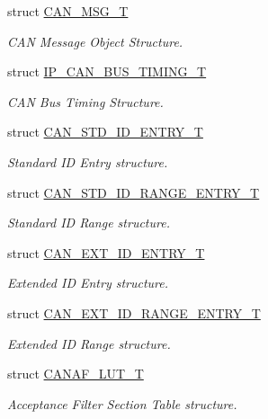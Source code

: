 \begin{DoxyCompactItemize}
struct \hyperlink{structCAN__MSG__T}{C\-A\-N\-\_\-\-M\-S\-G\-\_\-\-T}
\begin{DoxyCompactList}\small\item\em C\-A\-N Message Object Structure. \end{DoxyCompactList}\item 
struct \hyperlink{structIP__CAN__BUS__TIMING__T}{I\-P\-\_\-\-C\-A\-N\-\_\-\-B\-U\-S\-\_\-\-T\-I\-M\-I\-N\-G\-\_\-\-T}
\begin{DoxyCompactList}\small\item\em C\-A\-N Bus Timing Structure. \end{DoxyCompactList}\item 
struct \hyperlink{structCAN__STD__ID__ENTRY__T}{C\-A\-N\-\_\-\-S\-T\-D\-\_\-\-I\-D\-\_\-\-E\-N\-T\-R\-Y\-\_\-\-T}
\begin{DoxyCompactList}\small\item\em Standard I\-D Entry structure. \end{DoxyCompactList}\item 
struct \hyperlink{structCAN__STD__ID__RANGE__ENTRY__T}{C\-A\-N\-\_\-\-S\-T\-D\-\_\-\-I\-D\-\_\-\-R\-A\-N\-G\-E\-\_\-\-E\-N\-T\-R\-Y\-\_\-\-T}
\begin{DoxyCompactList}\small\item\em Standard I\-D Range structure. \end{DoxyCompactList}\item 
struct \hyperlink{structCAN__EXT__ID__ENTRY__T}{C\-A\-N\-\_\-\-E\-X\-T\-\_\-\-I\-D\-\_\-\-E\-N\-T\-R\-Y\-\_\-\-T}
\begin{DoxyCompactList}\small\item\em Extended I\-D Entry structure. \end{DoxyCompactList}\item 
struct \hyperlink{structCAN__EXT__ID__RANGE__ENTRY__T}{C\-A\-N\-\_\-\-E\-X\-T\-\_\-\-I\-D\-\_\-\-R\-A\-N\-G\-E\-\_\-\-E\-N\-T\-R\-Y\-\_\-\-T}
\begin{DoxyCompactList}\small\item\em Extended I\-D Range structure. \end{DoxyCompactList}\item 
struct \hyperlink{structCANAF__LUT__T}{C\-A\-N\-A\-F\-\_\-\-L\-U\-T\-\_\-\-T}
\begin{DoxyCompactList}\small\item\em Acceptance Filter Section Table structure. \end{DoxyCompactList}\end{DoxyCompactItemize}
